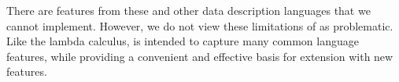There are features from these and other data description languages
that we cannot implement. However, we do not view these limitations of
\ddc{} as problematic. Like the lambda calculus, \ddc{} is intended to
capture many common language features, while providing a convenient
and effective basis for extension with new features. 


